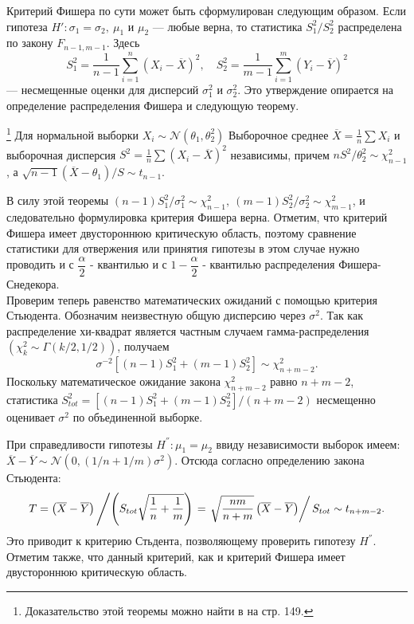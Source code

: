 Критерий Фишера по сути может быть сформулирован следующим образом.
Если гипотеза $ H': \sigma_1 = \sigma_2, \ \mu_1 $ и $ \mu_2 $ --- любые 
 верна, то статистика $ S_1^2 / S_2^2 $ распределена по закону
 $ F_{n-1,m-1} $. Здесь
$$
S_1^2 = \frac{1}{n - 1} \sum_{i = 1}^{n}(X_i - \overline{X})^2, \quad
S_2^2 = \frac{1}{m - 1} \sum_{i = 1}^{m}(Y_i - \overline{Y})^2
$$
--- несмещенные оценки для дисперсий $ \sigma_1^2 $ и $ \sigma_2^2 $.
Это утверждение опирается на определение распределения Фишера и следующую теорему.
\begin{theorem}\footnote{Доказательство этой теоремы можно найти в
	\cite{lagutin_stat} на стр. 149.}
	Для нормальной выборки $ X_i \sim \mathcal{N}(\theta_1, \theta_2^2) $ Выборочное
	 среднее $ \overline{X} = \frac{1}{n}\sum X_i $ и выборочная дисперсия
	 $ S^2 = \frac{1}{n} \sum (X_i - \overline{X})^2 $ независимы, причем
	 $ n S^2 / \theta_2^2 \sim \chi_{n-1}^2 $, а $\sqrt{n - 1}
	 (\overline{X} - \theta_1) / S \sim t_{n-1} $.
\end{theorem}
В силу этой теоремы $ (n-1) S_1^2 / \sigma_1^2 \sim \chi_{n-1}^2,
 \ (m - 1) S_2^2 / \sigma_2^2 \sim \chi_{m-1}^2 $, и следовательно
 формулировка критерия Фишера верна. Отметим, что критерий Фишера имеет
 двустороннюю критическую область, поэтому сравнение статистики для отвержения
 или принятия гипотезы в этом случае нужно проводить и с $ \dfrac{\alpha}{2} $
 - квантилью и с $ 1 - \dfrac{\alpha}{2} $ - квантилью распределения
 Фишера-Снедекора. \medskip\\
Проверим теперь равенство математических ожиданий с помощью критерия Стьюдента.
 Обозначим неизвестную общую дисперсию через $ \sigma^2 $. Так как распределение
 хи-квадрат является частным случаем гамма-распределения $(\chi_k^2 
 \sim \Gamma(k/2, 1/2)) $, получаем
$$
 \sigma^{-2} \left[(n - 1) S_1^2 + (m - 1) S_2^2 \right] \sim \chi_{n + m - 2}^2.
$$
Поскольку математическое ожидание закона $ \chi_{n + m - 2}^2 $ равно $ n + m - 2 $,
 статистика $ S_{tot}^2 = \left[(n - 1) S_1^2 + (m - 1) S_2^2 \right] / (n + m -2) $
 несмещенно оценивает $ \sigma^2 $ по объединенной выборке.

При справедливости гипотезы $ H^{''}: \mu_1 = \mu_2 $ ввиду независимости выборок
 имеем: $\overline{X} - \overline{Y} \sim \mathcal{N}(0, (1/n + 1/m)\sigma^2) $.
 Отсюда согласно определению закона Стьюдента:
$$
T = \left( \overline{X} - \overline{Y} \right) \left/ \left( S_{tot}
 \sqrt{\dfrac{1}{n} + \dfrac{1}{m}} \right) \right. = \left. \sqrt{\dfrac{nm}{n + m}} \left(\overline{X}
 - \overline{Y} \right) \right/ S_{tot} \sim t_{n + m - 2}.
$$
Это приводит к критерию Стьдента, позволяющему проверить гипотезу $ H^{''} $.
 Отметим также, что данный критерий, как и критерий Фишера имеет двустороннюю критическую
 область.